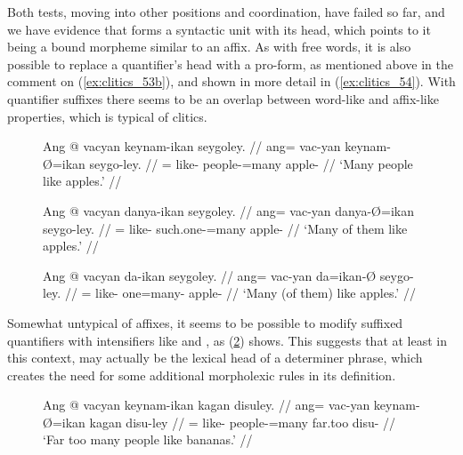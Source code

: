 Both tests, moving  into other positions
and coordination, have failed so far, and we have evidence that
 forms a syntactic unit with its head, which points to it
being a bound morpheme similar to an affix. As with free words, it is also
possible to replace a quantifier's head with a pro-form, as mentioned above in
the comment on (\ref{ex:clitics_53b}), and shown in more detail in
(\ref{ex:clitics_54}). With quantifier suffixes there seems to be an overlap
between word-like and affix-like properties, which is typical of clitics.

\begin{figure}[h]
\pex\label{ex:clitics_54}
\a\label{ex:clitics_54a}\begingl
	\gla Ang @ vacyan keynam-ikan seygoley. //
	\glb ang= vac-yan keynam-Ø=ikan seygo-ley. //
	\glc \AgtT{}= like-\TplM{} people-\Top{}=many apple-\PargI{} //
	\glft `Many people like apples.' //
\endgl

\a\label{ex:clitics_54b}\begingl
	\gla Ang @ vacyan danya-ikan seygoley. //
	\glb ang= vac-yan danya-Ø=ikan seygo-ley. //
	\glc \AgtT{}= like-\TplM{} such.one-\Top{}=many apple-\PargI{} //
	\glft `Many of them like apples.' //
\endgl

\a\label{ex:clitics_54c}\begingl
	\gla Ang @ vacyan da-ikan seygoley. //
	\glb ang= vac-yan da=ikan-Ø seygo-ley. //
	\glc \AgtT{}= like-\TplM{} one=many-\Top{} apple-\PargI{} //
	\glft `Many (of them) like apples.' //
\endgl
\xe
\end{figure}

Somewhat untypical of affixes, it seems to be possible to modify suffixed
quantifiers with intensifiers like  and
, as (\ref{ex:clitics_55}) shows. This suggests
that at least in this context,  may
actually be the lexical head of a determiner phrase, which creates the need for
some additional morpholexic rules in its definition.

\begin{figure}[h]
\ex\label{ex:clitics_55}\begingl
	\gla Ang @ vacyan keynam-ikan kagan disuley. //
	\glb ang= vac-yan keynam-Ø=ikan kagan disu-ley //
	\glc \AgtT{}= like-\TplM{} people-\Top{}=many far.too disu-\PargI{} //
	\glft `Far too many people like bananas.' //
\endgl\xe
\end{figure}

